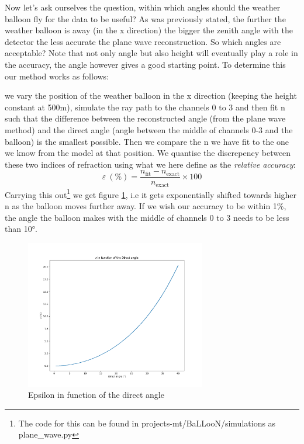 \documentclass[11pt,a4paper,faculty=we,language=en,doctype=report]{cls/ugent-doc}
\begin{document}
Now let's ask ourselves the question, within which angles should the
weather balloon fly for the data to be useful?  As was previously stated, the
further the weather balloon is away (in the x direction) the bigger the zenith
angle with the detector the less accurate the plane wave reconstruction.  So
which angles are acceptable? Note that not only angle but also height will eventually
play a role in the accuracy, the angle however gives a good starting point.
To determine this our method works as follows: 

we vary the position of the weather balloon in the x direction (keeping the
height constant at 500m), simulate the ray path to the channels 0 to 3 and then fit n
such that the difference between the reconstructed angle (from the plane wave
method) and the direct angle (angle between the middle of channels 0-3 and the
balloon) is the smallest possible.  Then we compare the n we have fit to the
one we know from the model at that position.  We quantise the discrepency
between these two indices of refraction using what we here define as the
\textit{relative accuracy}:
\begin{equation}
  \varepsilon\ (\%) = \frac{n_\text{fit} - n_{\text{exact}}}{n_{\text{exact}}} \times 100
\end{equation}
Carrying this out\footnote{The code for this can be found in projects-mt/BaLLooN/simulations as plane\_wave.py} we get figure \ref{fig:EpsilonIFODirect}, i.e it gets
exponentially shifted towards higher n as the balloon moves further away. If we wish our
accuracy to be within 1\%, the angle the balloon makes with the middle of channels 0 to 3 needs
to be less than 10°.
\begin{figure}
	\centering
	\includegraphics[width=0.7\textwidth]{EpsilonIFODirect.pdf}
	\caption{Epsilon in function of the direct angle}
	\label{fig:EpsilonIFODirect}
\end{figure}
\end{document}
